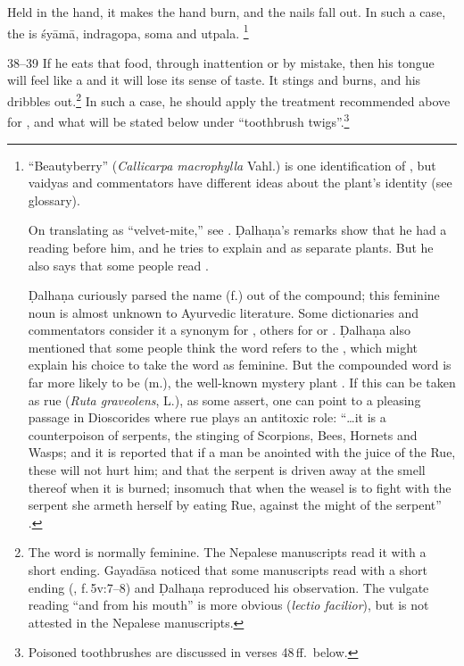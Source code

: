 \begin{translation}
Held in the hand, it makes the hand burn, and the nails fall out. In such a case,
the  is \gls{śyāmā}, %
\gls{indragopa}, %
soma and \gls{utpala}.%
\footnote{\label{beautyberry}“Beautyberry” (\emph{Callicarpa macrophylla} 
Vahl.) is one
identification of , but vaidyas and commentators have different ideas
about the plant's identity (see glossary).  
\par 
On translating  as “velvet-mite,”
see \cite{lien-1978}. Ḍalhaṇa's remarks show that he had a reading
 before him, and he tries to explain  and  as
separate plants.  But he also says that some people read . 
\par
 Ḍalhaṇa
curiously parsed the name  (f.) out of the compound; this feminine noun
is almost unknown to Ayurvedic literature.  Some dictionaries and commentators
consider it a synonym for , others for  or
.  Ḍalhaṇa also mentioned that some people think the word refers to
the , which might explain his choice to take the word as
feminine.  But the compounded word is far more likely to be  (m.), the
well-known mystery plant \citep[see][76--78, 125]{wuja-2003}.  If this can be
taken as rue (\emph{Ruta graveolens}, L.), as some assert, one can point to a
pleasing passage in Dioscorides where rue plays an antitoxic role: “\ldots it is a
counterpoison of serpents, the stinging of Scorpions, Bees, Hornets and Wasps; and
it is reported that if a man be anointed with the juice of the Rue, these will not
hurt him; and that the serpent is driven away at the smell thereof when it is
burned; insomuch that when the weasel is to fight with the serpent she armeth
herself by eating Rue, against the might of the serpent” \parencites[cited 
from][262]{wren-1956}[not found in][]{osba-dios}.}
     
     \item [38--39] If he eats that food, through inattention or by mistake,
then his tongue will feel like a  and it will lose its
sense of taste. It stings and %
burns, and his \label{saliva} dribbles out.\footnote{The
    word  is normally feminine.   The Nepalese manuscripts read it 
    with
    a short  ending.  Gayadāsa noticed that some manuscripts read
     with a short  ending (,
    f.\,5v:7--8) and Ḍalhaṇa reproduced his observation.  The vulgate reading
     “and from his mouth” is more obvious (\emph{lectio facilior}), 
    but
    is not attested in the Nepalese manuscripts.} In such a case, he should apply
    the treatment recommended above for , and what will 
    be stated
    below under “toothbrush twigs”.\footnote{Poisoned toothbrushes are 
    discussed in
        verses 48\,ff.\ below.}
     

\end{translation}
